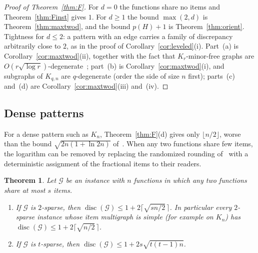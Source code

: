 \documentclass[11pt,letterpaper]{article}
\newtheorem{theorem}{Theorem}[section]
\theoremstyle{definition}
\newcommand{\cG}{\mathcal{G}}
\DeclareMathOperator{\disc}{disc}
\begin{document}
\begin{proof}[Proof of Theorem~\ref{thm:F}]
For $d=0$ the functions share no items and Theorem~\ref{thm:Finst} gives $1$. For $d\ge1$ the bound
$\max(2,d)$ is Theorem~\ref{thm:maxtwod}, and the bound $p(H)+1$ is Theorem~\ref{thm:orient}.
Tightness for $d\le2$: a pattern with an edge carries a family of discrepancy arbitrarily close to
$2$, as in the proof of Corollary~\ref{cor:leveled}(i). Part~(a) is Corollary~\ref{cor:maxtwod}(ii),
together with the fact that $K_r$-minor-free graphs are $O(r\sqrt{\log r})$-degenerate~\cite{Kos84,Tho84};
part~(b) is Corollary~\ref{cor:maxtwod}(i), and subgraphs of $K_{q,n}$ are $q$-degenerate (order the side
of size $n$ first); parts~(c) and~(d) are Corollary~\ref{cor:maxtwod}(iii) and~(iv).
\end{proof}

\subsection{Dense patterns}\label{sec:dense}

For a dense pattern such as $K_n$, Theorem~\ref{thm:F}(d) gives only $\lfloor n/2\rfloor$, worse than the bound
$\sqrt{2n(1+\ln2n)}$ of~\cite{HMMS25}. When any two functions share few items, the logarithm can be
removed by replacing the randomized rounding of~\cite{HMMS25} with a deterministic assignment of the
fractional items to their readers.

\begin{theorem}\label{thm:sqrtn}
Let $\cG$ be an instance with $n$ functions in which any two functions share at most $s$ items.
\begin{enumerate}[label=(\alph*),itemsep=0pt]
\item If $\cG$ is $2$-sparse, then $\disc(\cG)\le1+2\lceil\sqrt{sn/2}\,\rceil$. In particular every
$2$-sparse instance whose item multigraph is simple (for example on $K_n$) has
$\disc(\cG)\le1+2\lceil\sqrt{n/2}\,\rceil$.
\item If $\cG$ is $t$-sparse, then $\disc(\cG)\le1+2s\sqrt{t(t-1)n}$.
\end{enumerate}
\end{theorem}
\end{document}
